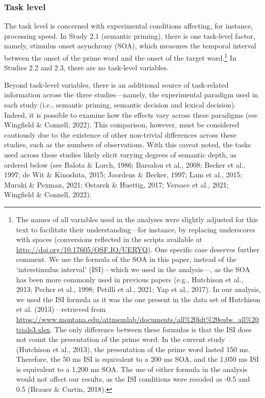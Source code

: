 \documentclass[
  12pt,
  man,floatsintext]{apa7}
\begin{document}
\hypertarget{task-level}{%
\subsubsection{Task level}\label{task-level}}

The task level is concerned with experimental conditions affecting, for instance, processing speed. In Study 2.1 (semantic priming), there is one task-level factor, namely, stimulus onset asynchrony (SOA), which measures the temporal interval between the onset of the prime word and the onset of the target word.\footnote{The names of all variables used in the analyses were slightly adjusted for this text to facilitate their understanding---for instance, by replacing underscores with spaces (conversions reflected in the scripts available at \url{http://doi.org/10.17605/OSF.IO/UERYQ}). One specific case deserves further comment. We use the formula of the SOA in this paper, instead of the `interstimulus interval' (ISI)---which we used in the analysis---, as the SOA has been more commonly used in previous papers (e.g., Hutchison et al., 2013; Pecher et al., 1998; Petilli et al., 2021; Yap et al., 2017). In our analysis, we used the ISI formula as it was the one present in the data set of Hutchison et al. (2013)---retrieved from \url{https://www.montana.edu/attmemlab/documents/all\%20ldt\%20subs_all\%20trials3.xlsx}. The only difference between these formulas is that the ISI does not count the presentation of the prime word. In the current study (Hutchison et al., 2013), the presentation of the prime word lasted 150 ms. Therefore, the 50 ms ISI is equivalent to a 200 ms SOA, and the 1,050 ms ISI is equivalent to a 1,200 ms SOA. The use of either formula in the analysis would not affect our results, as the ISI conditions were recoded as -0.5 and 0.5 (Brauer \& Curtin, 2018).} In Studies 2.2 and 2.3, there are no task-level variables.

Beyond task-level variables, there is an additional source of task-related information across the three studies---namely, the experimental paradigm used in each study (i.e., semantic priming, semantic decision and lexical decision). Indeed, it is possible to examine how the effects vary across these paradigms (see Wingfield \& Connell, 2022). This comparison, however, must be considered cautiously due to the existence of other non-trivial differences across these studies, such as the numbers of observations. With this caveat noted, the tasks used across these studies likely elicit varying degrees of semantic depth, as ordered below (see Balota \& Lorch, 1986; Barsalou et al., 2008; Becker et al., 1997; de Wit \& Kinoshita, 2015; Joordens \& Becker, 1997; Lam et al., 2015; Muraki \& Pexman, 2021; Ostarek \& Huettig, 2017; Versace et al., 2021; Wingfield \& Connell, 2022).
\end{document}
